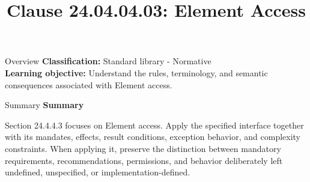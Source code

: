 \documentclass[10pt,letterpaper]{article}
\title{Clause 24.04.04.03: Element Access}
\author{}
\date{}
\begin{document}
\maketitle
\begin{CornellOverviewBox}{Overview}
\textbf{Classification:} Standard library - Normative\\[2pt]
\textbf{Learning objective:} Understand the rules, terminology, and semantic consequences associated with Element access.
\end{CornellOverviewBox}\begin{CornellSummaryBox}{Summary}
{\sffamily\bfseries\color{Accent} Summary}\par\vspace{3pt}Section 24.4.4.3 focuses on Element access. Apply the specified interface together with its mandates, effects, result conditions, exception behavior, and complexity constraints. When applying it, preserve the distinction between mandatory requirements, recommendations, permissions, and behavior deliberately left undefined, unspecified, or implementation-defined.
\end{CornellSummaryBox}
\end{document}
